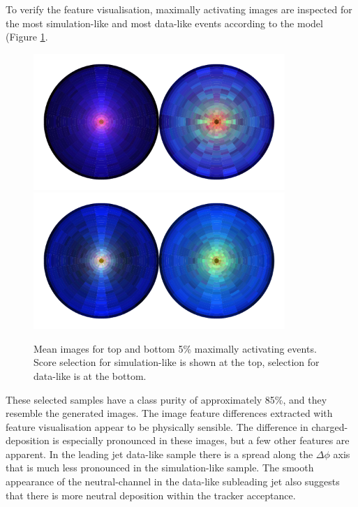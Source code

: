 To verify the feature visualisation, maximally activating images are inspected for the most simulation-like and most data-like events according to the model (Figure \ref{fig:event_categorisation:zee_data_sim_max_act}. 
\begin{figure}[h!]
    \begin{center}
        \includegraphics[width=0.85\textwidth]{figures/event_selection/zee_max_act_mean_sim.pdf}
        \includegraphics[width=0.85\textwidth]{figures/event_selection/zee_max_act_mean_data.pdf}
    \end{center}
    \caption{Mean images for top and bottom 5\% maximally activating events. 
             Score selection for simulation-like is shown at the top, selection for data-like is at the bottom.}
    \label{fig:event_categorisation:zee_data_sim_max_act}
\end{figure}

These selected samples have a class purity of approximately 85\%, and they resemble the generated images. The image feature differences extracted with feature visualisation appear to be physically sensible. 
The difference in charged-\pt deposition is especially pronounced in these images, but a few other features are apparent. In the leading jet data-like sample there is a spread along the $\Delta\phi$ axis that is much less pronounced in the simulation-like sample. 
The smooth appearance of the neutral-\pt channel in the data-like subleading jet also suggests that there is more neutral deposition within the tracker acceptance. 



